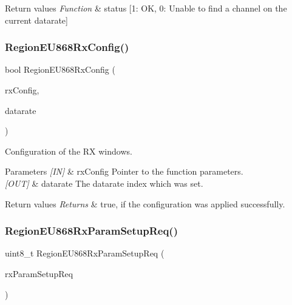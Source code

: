 \begin{DoxyRetVals}{Return values}
{\em Function} & status \mbox{[}1\+: OK, 0\+: Unable to find a channel on the current datarate\mbox{]} \\
\hline
\end{DoxyRetVals}
\mbox{\label{group__REGIONEU868_gae57b8f1a0b5e45ab2371fbc0737322a7}} 
\subsubsection{\texorpdfstring{Region\+E\+U868\+Rx\+Config()}{RegionEU868RxConfig()}}
{\footnotesize\ttfamily bool Region\+E\+U868\+Rx\+Config (\begin{DoxyParamCaption}\item[{\hyperlink{group__REGION_ga375c038078dfcfc7ef14280021db719e}{Rx\+Config\+Params\+\_\+t} $\ast$}]{rx\+Config,  }\item[{int8\+\_\+t $\ast$}]{datarate }\end{DoxyParamCaption})}



Configuration of the RX windows. 


\begin{DoxyParams}{Parameters}
{\em \mbox{[}\+I\+N\mbox{]}} & rx\+Config Pointer to the function parameters.\\
\hline
{\em \mbox{[}\+O\+U\+T\mbox{]}} & datarate The datarate index which was set.\\
\hline
\end{DoxyParams}

\begin{DoxyRetVals}{Return values}
{\em Returns} & true, if the configuration was applied successfully. \\
\hline
\end{DoxyRetVals}
\mbox{\label{group__REGIONEU868_gaa175de2c9f3882ef0b89120db3d8882d}} 
\subsubsection{\texorpdfstring{Region\+E\+U868\+Rx\+Param\+Setup\+Req()}{RegionEU868RxParamSetupReq()}}
{\footnotesize\ttfamily uint8\+\_\+t Region\+E\+U868\+Rx\+Param\+Setup\+Req (\begin{DoxyParamCaption}\item[{\hyperlink{group__REGION_ga7165f282c670c728c36d534df2285157}{Rx\+Param\+Setup\+Req\+Params\+\_\+t} $\ast$}]{rx\+Param\+Setup\+Req }\end{DoxyParamCaption})}



